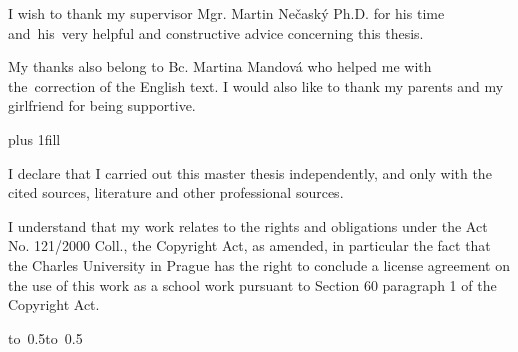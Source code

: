 \documentclass[12pt,a4paper]{report}
\let\openright=\clearpage
\begin{document}
\newpage



\openright

\noindent
I wish to thank my supervisor Mgr. Martin Nečaský Ph.D. for his time and~his~very
helpful and constructive advice concerning this thesis.

My thanks also belong to Bc. Martina Mandová who helped me
with the~correction of the English text. I would also like to thank
my parents and my girlfriend for being supportive.

\newpage


\vglue 0pt plus 1fill

\noindent
I declare that I carried out this master thesis independently, and only with the cited
sources, literature and other professional sources.

\medskip\noindent
I understand that my work relates to the rights and obligations under the Act No.
121/2000 Coll., the Copyright Act, as amended, in particular the fact that the Charles
University in Prague has the right to conclude a license agreement on the use of this
work as a school work pursuant to Section 60 paragraph 1 of the Copyright Act.

\vspace{10mm}

\hbox{\hbox to 0.5\hbox to 0.5}

\vspace{20mm}
\newpage

\end{document}

